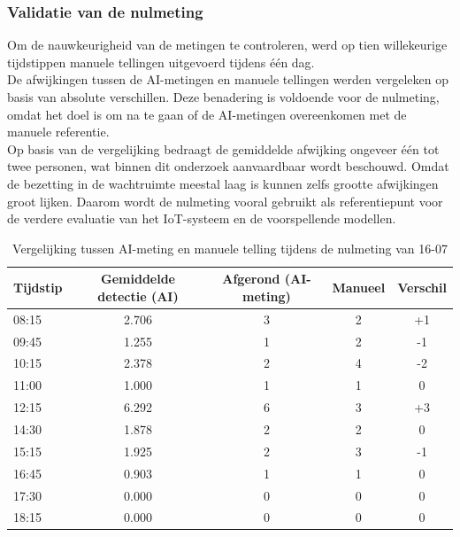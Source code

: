 \subsubsection{Validatie van de nulmeting}
Om de nauwkeurigheid van de metingen te controleren, werd op tien willekeurige tijdstippen manuele tellingen uitgevoerd tijdens één dag. \\

De afwijkingen tussen de AI-metingen en manuele tellingen werden vergeleken op basis van absolute verschillen. Deze benadering is voldoende voor de nulmeting, omdat het doel is om na te gaan of de AI-metingen overeenkomen met de manuele referentie. \\

Op basis van de vergelijking bedraagt de gemiddelde afwijking ongeveer één tot twee personen, wat binnen dit onderzoek aanvaardbaar wordt beschouwd. Omdat de bezetting in de wachtruimte meestal laag is kunnen zelfs grootte afwijkingen groot lijken. Daarom wordt de nulmeting vooral gebruikt als referentiepunt voor de verdere evaluatie van het IoT-systeem en de voorspellende modellen. 


\begin{table}[H]
    \caption{Vergelijking tussen AI-meting en manuele telling tijdens de nulmeting van 16-07}
    \label{tab:validatie_ai_manueel}
    \centering
    \begin{tabular}{@{}lcccc@{}}
        \toprule
        \textbf{Tijdstip} & \textbf{Gemiddelde detectie (AI)} & \textbf{Afgerond (AI-meting)} & \textbf{Manueel} & \textbf{Verschil} \\
        \midrule
        08:15 & 2.706 & 3 & 2 & +1 \\
        09:45 & 1.255 & 1 & 2 & -1 \\
        10:15 & 2.378 & 2 & 4 & -2 \\
        11:00 & 1.000 & 1 & 1 & 0 \\
        12:15 & 6.292 & 6 & 3 & +3 \\
        14:30 & 1.878 & 2 & 2 & 0 \\
        15:15 & 1.925 & 2 & 3 & -1 \\
        16:45 & 0.903 & 1 & 1 & 0 \\
        17:30 & 0.000 & 0 & 0 & 0 \\
        18:15 & 0.000 & 0 & 0 & 0 \\
        \bottomrule
    \end{tabular}
\end{table}



